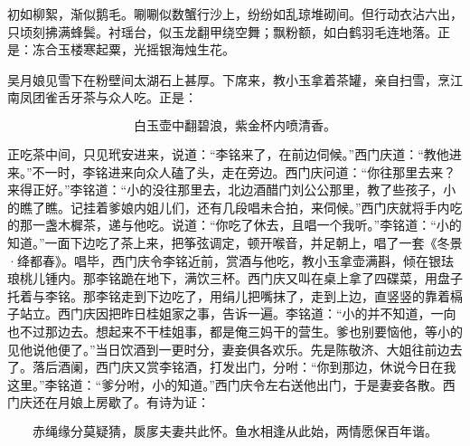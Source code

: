 初如柳絮，渐似鹅毛。唰唰似数蟹行沙上，纷纷如乱琼堆砌间。但行动衣沾六出，只顷刻拂满蜂鬓。衬瑶台，似玉龙翻甲绕空舞；飘粉额，如白鹤羽毛连地落。正是：冻合玉楼寒起粟，光摇银海烛生花。

吴月娘见雪下在粉壁间太湖石上甚厚。下席来，教小玉拿着茶罐，亲自扫雪，烹江南凤团雀舌牙茶与众人吃。正是：

\[
白玉壶中翻碧浪，紫金杯内喷清香。
\]

正吃茶中间，只见玳安进来，说道：“李铭来了，在前边伺候。”西门庆道：“教他进来。”不一时，李铭进来向众人磕了头，走在旁边。西门庆问道：“你往那里去来？来得正好。”李铭道：“小的没往那里去，北边酒醋门刘公公那里，教了些孩子，小的瞧了瞧。记挂着爹娘内姐儿们，还有几段唱未合拍，来伺候。”西门庆就将手内吃的那一盏木樨茶，递与他吃。说道：“你吃了休去，且唱一个我听。”李铭道：“小的知道。”一面下边吃了茶上来，把筝弦调定，顿开喉音，并足朝上，唱了一套《冬景·绛都春》。唱毕，西门庆令李铭近前，赏酒与他吃，教小玉拿壶满斟，倾在银珐琅桃儿锺内。那李铭跪在地下，满饮三杯。西门庆又叫在桌上拿了四碟菜，用盘子托着与李铭。那李铭走到下边吃了，用绢儿把嘴抹了，走到上边，直竖竖的靠着槅子站立。西门庆因把昨日桂姐家之事，告诉一遍。李铭道：“小的并不知道，一向也不过那边去。想起来不干桂姐事，都是俺三妈干的营生。爹也别要恼他，等小的见他说他便了。”当日饮酒到一更时分，妻妾俱各欢乐。先是陈敬济、大姐往前边去了。落后酒阑，西门庆又赏李铭酒，打发出门，分咐：“你到那边，休说今日在我这里。”李铭道：“爹分咐，小的知道。”西门庆令左右送他出门，于是妻妾各散。西门庆还在月娘上房歇了。有诗为证：

\[
赤绳缘分莫疑猜，扊扅夫妻共此怀。
鱼水相逢从此始，两情愿保百年谐。
\]

